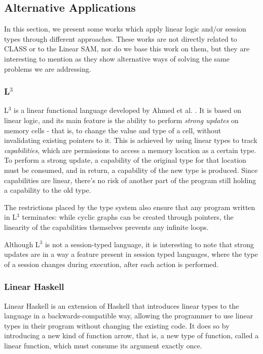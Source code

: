 \subsection{Alternative Applications}

In this section, we present some works \cite{Ahmed:2007, Bernardy:2017,Kokke:2021,Jespersen:2015, Lagaillardie:2022} which apply linear logic and/or session types through different approaches. These works are not directly related to CLASS or to the Linear SAM, nor do we base this work on them, but they are interesting to mention as they show alternative ways of solving the same problems we are addressing.

\subsubsection{\texorpdfstring{L$^3$}{L3}}

L$^3$ is a linear functional language developed by Ahmed et al. \cite{Ahmed:2007}. It is based on linear logic, and its main feature is the ability to perform \textit{strong updates} on memory cells - that is, to change the value and type of a cell, without invalidating existing pointers to it. This is achieved by using linear types to track \textit{capabilities}, which are permissions to access a memory location as a certain type. To perform a strong update, a capability of the original type for that location must be consumed, and in return, a capability of the new type is produced. Since capabilities are linear, there's no risk of another part of the program still holding a capability to the old type.

The restrictions placed by the type system also ensure that any program written in L$^3$ terminates: while cyclic graphs can be created through pointers, the linearity of the capabilities themselves prevents any infinite loops.

Although L$^3$ is not a session-typed language, it is interesting to note that strong updates are in a way a feature present in session typed languages, where the type of a session changes during execution, after each action is performed.

\subsubsection{Linear Haskell}

Linear Haskell \cite{Bernardy:2017} is an extension of Haskell that introduces linear types to the language in a backwards-compatible way, allowing the programmer to use linear types in their program without changing the existing code. It does so by introducing a new kind of function arrow, that is, a new type of function, called a linear function, which must consume its argument exactly once.

